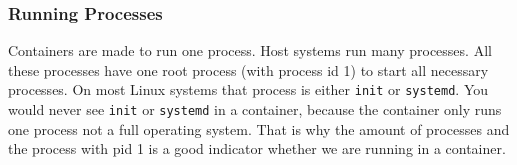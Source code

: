 \subsubsection{Running Processes}
Containers are made to run one process. Host systems run many processes. All these processes have one root process (with process id 1) to start all necessary processes. On most Linux systems that process is either \lstinline{init} or \lstinline{systemd}. You would never see \lstinline{init} or \lstinline{systemd} in a container, because the container only runs one process not a full operating system. That is why the amount of processes and the process with pid 1 is a good indicator whether we are running in a container.
